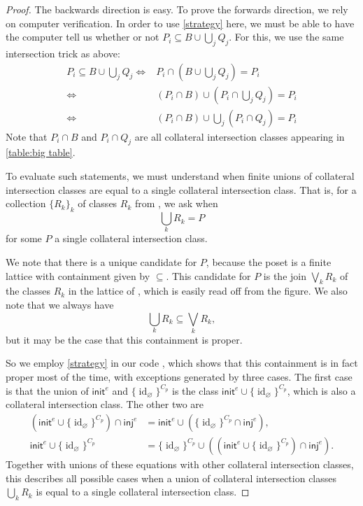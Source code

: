 \documentclass{amsart}
\renewcommand\emptyset\varnothing
\newcommand{\inj}{\mathsf{inj}}
\newcommand{\init}{\mathsf{init}}
\DeclareMathOperator{\id}{id}
\numberwithin{equation}{section}
\theoremstyle{definition}
\begin{document}
\begin{proof}
	The backwards direction is easy. To prove the forwards direction, we rely on computer verification. In order to use \cref{strategy} here, we must be able to have the computer tell us whether or not $P_i \subseteq B \cup \bigcup_j Q_j$. For this, we use the same intersection trick as above:
	\begin{align*}
		P_i \subseteq B \cup \bigcup_j Q_j\iff & P_i \cap (B \cup \bigcup_j Q_j) = P_i            \\
		\iff                                   & (P_i \cap B) \cup (P_i \cap \bigcup_j Q_j) = P_i \\
		\iff                                   & (P_i \cap B) \cup \bigcup_j (P_i\cap Q_j) = P_i
	\end{align*}
	Note that $P_i \cap B$ and $P_i \cap Q_j$ are all collateral intersection classes appearing in \cref{table:big table}.

	To evaluate such statements, we must understand when finite unions of collateral intersection classes are equal to a single collateral intersection class. That is, for a collection $\{R_k\}_k$ of classes $R_k$ from , we ask when
	\[
		\bigcup_k R_k = P
	\]
	for some $P$ a single collateral intersection class.

	We note that there is a unique candidate for $P$, because the poset  is a finite lattice with containment given by $\subseteq$. This candidate for $P$ is the join $\bigvee_k R_k$ of the classes $R_k$ in the lattice of , which is easily read off from the figure. We also note that we always have \[\bigcup_k R_k \subseteq \bigvee_k R_k,\] but it may be the case that this containment is proper.

	So we employ \cref{strategy} in our code \cite{code}, which shows that this containment is in fact proper most of the time, with exceptions generated by three cases. The first case is that the union of $\init^e$ and $\{\id_\emptyset\}^{C_p}$ is the class $\init^e \cup \{\id_\emptyset\}^{C_p}$, which is also a collateral intersection class. The other two are
	\begin{align*}
		\left(\init^e \cup \{\id_\emptyset\}^{C_p}\right) \cap \inj^e & = \init^e \cup \left(\{\id_\emptyset\}^{C_p} \cap \inj^e\right),                                           \\
		\init^e \cup \{\id_\emptyset\}^{C_p}                          & = \{\id_\emptyset\}^{C_p} \cup \left(\left(\init^e \cup \{\id_\emptyset\}^{C_p}\right) \cap \inj^e\right).
	\end{align*}
	Together with unions of these equations with other collateral intersection classes, this describes all possible cases when a union of collateral intersection classes $\bigcup_k R_k$ is equal to a single collateral intersection class.


\end{proof}
\end{document}

